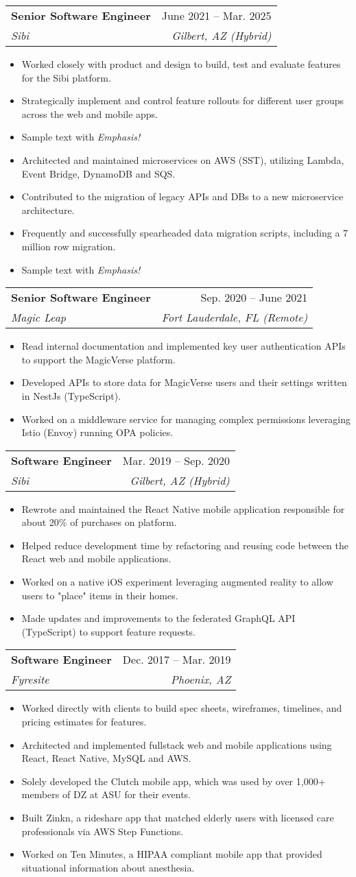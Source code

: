 \documentclass[letterpaper,11pt]{article}
\makeatletter
\newcommand{\resumeItem}[1]{
  \item\small{
    {#1 \vspace{-2pt}}
  }
}
\newcommand{\resumeSubheading}[4]{
  \vspace{-2pt}\item
    \begin{tabular*}{0.97\textwidth}[t]{l@{\extracolsep{\fill}}r}
      \textbf{#1} & #2 \\
      \textit{\small#3} & \textit{\small #4} \\
    \end{tabular*}\vspace{-7pt}
}
\newcommand{\resumeItemListStart}{\begin{itemize}}
\newcommand{\resumeItemListEnd}{\end{itemize}\vspace{-5pt}}
\makeatother
\begin{document}
    \resumeSubheading
      {Senior Software Engineer}{June 2021 -- Mar. 2025}
      {Sibi}{Gilbert, AZ (Hybrid)}
      \resumeItemListStart
        \resumeItem{Worked closely with product and design to build, test and evaluate features for the Sibi platform.}
        \resumeItem{Strategically implement and control feature rollouts for different user groups across the web and mobile apps.}
        \resumeItem{Sample text with \emph{Emphasis!}}
        \resumeItem{Architected and maintained microservices on AWS (SST), utilizing Lambda, Event Bridge, DynamoDB and SQS.}
        \resumeItem{Contributed to the migration of legacy APIs and DBs to a new microservice architecture.}
        \resumeItem{Frequently and successfully spearheaded data migration scripts, including a 7 million row migration.}
        \resumeItem{Sample text with \emph{Emphasis!}}
      \resumeItemListEnd

    \resumeSubheading
      {Senior Software Engineer}{Sep. 2020 -- June 2021}
      {Magic Leap}{Fort Lauderdale, FL (Remote)}
      \resumeItemListStart
        \resumeItem{Read internal documentation and implemented key user authentication APIs to support the MagicVerse platform.}
        \resumeItem{Developed APIs to store data for MagicVerse users and their settings written in NestJs (TypeScript).}
        \resumeItem{Worked on a middleware service for managing complex permissions leveraging Istio (Envoy) running OPA policies.}
      \resumeItemListEnd

    \resumeSubheading
      {Software Engineer}{Mar. 2019 -- Sep. 2020}
      {Sibi}{Gilbert, AZ (Hybrid)}
      \resumeItemListStart
        \resumeItem{Rewrote and maintained the React Native mobile application responsible for about 20\% of purchases on platform.}
        \resumeItem{Helped reduce development time by refactoring and reusing code between the React web and mobile applications.}
        \resumeItem{Worked on a native iOS experiment leveraging augmented reality to allow users to "place" items in their homes.}
        \resumeItem{Made updates and improvements to the federated GraphQL API (TypeScript) to support feature requests.}
      \resumeItemListEnd

    \resumeSubheading
      {Software Engineer}{Dec. 2017 -- Mar. 2019}
      {Fyresite}{Phoenix, AZ}
      \resumeItemListStart
        \resumeItem{Worked directly with clients to build spec sheets, wireframes, timelines, and pricing estimates for features.}
        \resumeItem{Architected and implemented fullstack web and mobile applications using React, React Native, MySQL and AWS.}
        \resumeItem{Solely developed the Clutch mobile app, which was used by over 1,000+ members of DZ at ASU for their events.}
        \resumeItem{Built Zinkn, a rideshare app that matched elderly users with licensed care professionals via AWS Step Functions.}
        \resumeItem{Worked on Ten Minutes, a HIPAA compliant mobile app that provided situational information about anesthesia.}
      \resumeItemListEnd
\end{document}
